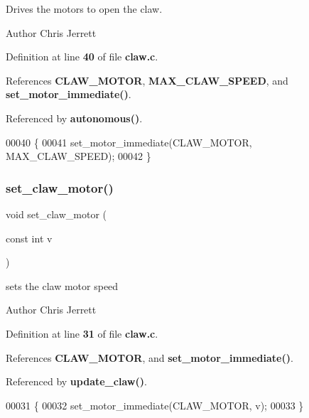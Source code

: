 Drives the motors to open the claw. 

\begin{DoxyAuthor}{Author}
Chris Jerrett 
\end{DoxyAuthor}


Definition at line \textbf{ 40} of file \textbf{ claw.\+c}.



References \textbf{ C\+L\+A\+W\+\_\+\+M\+O\+T\+OR}, \textbf{ M\+A\+X\+\_\+\+C\+L\+A\+W\+\_\+\+S\+P\+E\+ED}, and \textbf{ set\+\_\+motor\+\_\+immediate()}.



Referenced by \textbf{ autonomous()}.


\begin{DoxyCode}
00040                  \{
00041   set_motor_immediate(CLAW_MOTOR, MAX_CLAW_SPEED);
00042 \}
\end{DoxyCode}
\mbox{\label{claw_8h_a3a57f998b1884d39b0cc786689f7086f}} 
\subsubsection{set\+\_\+claw\+\_\+motor()}
{\footnotesize\ttfamily void set\+\_\+claw\+\_\+motor (\begin{DoxyParamCaption}\item[{const int}]{v }\end{DoxyParamCaption})}



sets the claw motor speed 

\begin{DoxyAuthor}{Author}
Chris Jerrett 
\end{DoxyAuthor}


Definition at line \textbf{ 31} of file \textbf{ claw.\+c}.



References \textbf{ C\+L\+A\+W\+\_\+\+M\+O\+T\+OR}, and \textbf{ set\+\_\+motor\+\_\+immediate()}.



Referenced by \textbf{ update\+\_\+claw()}.


\begin{DoxyCode}
00031                                 \{
00032   set_motor_immediate(CLAW_MOTOR, v);
00033 \}
\end{DoxyCode}
\mbox{\label{claw_8h_a0122b78972344264b8a276a559cfce4a}} 
